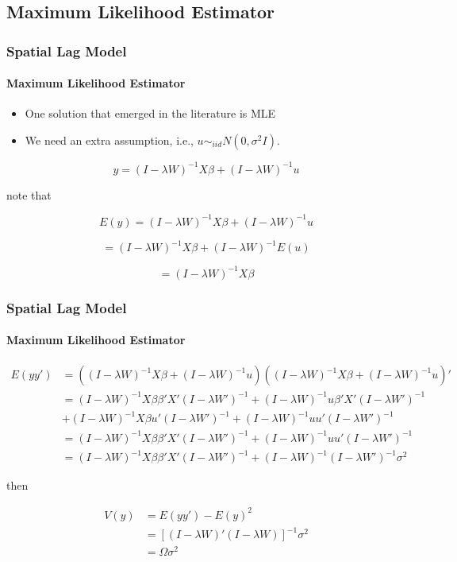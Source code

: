\documentclass[
  shownotes,
  xcolor={svgnames},
  hyperref={colorlinks,citecolor=DarkBlue,linkcolor=DarkRed,urlcolor=DarkBlue}
  ]{beamer}
\begin{document}
\subsection{Maximum Likelihood Estimator}
\begin{frame}[fragile]
\frametitle{Spatial Lag Model}
\framesubtitle{Maximum Likelihood Estimator}
\begin{itemize}
\item One solution that emerged in the literature is MLE
\item We need an extra assumption, i.e.,  $u\sim_{iid}N(0,\sigma^{2}I)$. 
\end{itemize}

\[
y=(I-\lambda W)^{-1}X\beta+(I-\lambda W)^{-1}u
\]

note that

\[
E(y)=(I-\lambda W)^{-1}X\beta+(I-\lambda W)^{-1}u
\]

\[
=(I-\lambda W)^{-1}X\beta+(I-\lambda W)^{-1}E(u)
\]

\[
=(I-\lambda W)^{-1}X\beta
\]


\end{frame}
\begin{frame}[fragile]
\frametitle{Spatial Lag Model}
\framesubtitle{Maximum Likelihood Estimator}



\begin{align}
E(yy') & =((I-\lambda W)^{-1}X\beta+(I-\lambda W)^{-1}u)((I-\lambda W)^{-1}X\beta+(I-\lambda W)^{-1}u)' \nonumber \\ 
& = (I-\lambda W)^{-1}X\beta\beta'X'(I-\lambda W')^{-1}+(I-\lambda W)^{-1}u\beta'X'(I-\lambda W')^{-1} \nonumber \\
&+(I-\lambda W)^{-1}X\beta u'(I-\lambda W')^{-1}+(I-\lambda W)^{-1}uu'(I-\lambda W')^{-1}  \nonumber\\
&=(I-\lambda W)^{-1}X\beta\beta'X'(I-\lambda W')^{-1}+(I-\lambda W)^{-1}uu'(I-\lambda W')^{-1}  \nonumber \\
&=(I-\lambda W)^{-1}X\beta\beta'X'(I-\lambda W')^{-1}+(I-\lambda W)^{-1}(I-\lambda W')^{-1}\sigma^{2} \nonumber 
\end{align}

then

\begin{align}
V(y)&=E(yy')-E(y)^2 \nonumber \\ 
&=[(I-\lambda W)'(I-\lambda W)]^{-1}\sigma^{2} \nonumber \\ 
&=\Omega\sigma^{2}
\end{align}


\end{frame}
\end{document}
